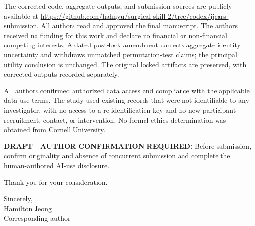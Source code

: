 \documentclass[10pt]{article}
\begin{document}
The corrected code, aggregate outputs, and submission sources are publicly available at \url{https://github.com/hahnyu/surgical-skill-2/tree/codex/ijcars-submission}. All authors read and approved the final manuscript. The authors received no funding for this work and declare no financial or non-financial competing interests. A dated post-lock amendment corrects aggregate identity uncertainty and withdraws unmatched permutation-test claims; the principal utility conclusion is unchanged. The original locked artifacts are preserved, with corrected outputs recorded separately.

All authors confirmed authorized data access and compliance with the applicable data-use terms. The study used existing records that were not identifiable to any investigator, with no access to a re-identification key and no new participant recruitment, contact, or intervention. No formal ethics determination was obtained from Cornell University.

\textbf{DRAFT---AUTHOR CONFIRMATION REQUIRED:} Before submission, confirm originality and absence of concurrent submission and complete the human-authored AI-use disclosure.

Thank you for your consideration.

Sincerely,\\[1.5em]
Hamilton Jeong\\
Corresponding author
\end{document}
